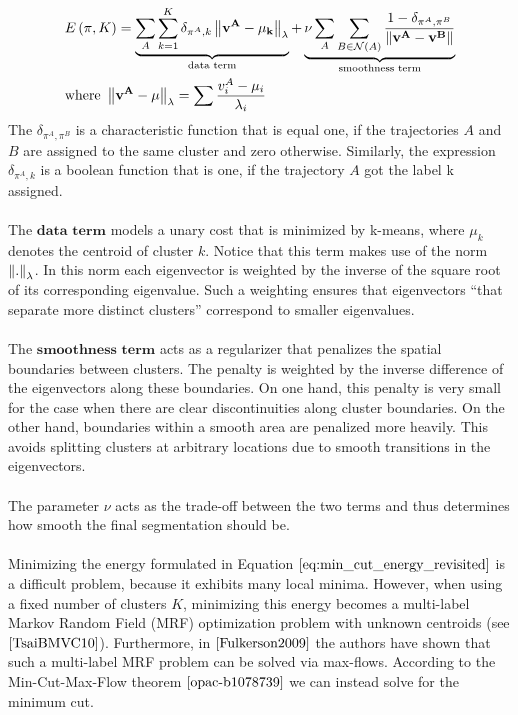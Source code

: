 \begin{equation}
\begin{aligned}
& E \left( \pi, K \right) = \underbrace{\sum_{A} \sum_{k=1}^K \delta_{\pi^A, k} \left\lVert\bf{v}^A - \mu_k\right\rVert_{\lambda}}_\text{data term} + \underbrace{\nu \sum_A \sum_{B \in \mathcal{N}(A)} \frac{1- \delta_{\pi^A, \pi^B}}{\left\lVert\bf{v}^A - \bf{v}^B\right\rVert}}_\text{smoothness term} \\
& \text{where } \left\lVert\bf{v}^A - \bf{\mu}\right\rVert_\lambda = \sum \frac{v_i^A -  \mu_i}{\lambda_i}
\end{aligned} 
\label{eq:min_cut_energy_revisited}
\end{equation}
The $\delta_{\pi^A, \pi^B}$ is a characteristic function that is equal one, if the trajectories $A$ and $B$ are assigned to the same cluster and zero otherwise. Similarly, the expression $\delta_{\pi^A, k}$ is a boolean function that is one, if the trajectory $A$ got the label k assigned. \\ \\
The $\textbf{data term}$ models a unary cost that is minimized by k-means, where $\mu_k$ denotes the centroid of cluster $k$. Notice that this term makes use of the norm $\left\lVert.\right\rVert_{\lambda}$. In this norm each eigenvector is weighted by the inverse of the square root of its corresponding eigenvalue. Such a weighting ensures that eigenvectors \enquote{that separate more distinct clusters} correspond to smaller eigenvalues. \\ \\
The $\textbf{smoothness term}$ acts as a regularizer that penalizes the spatial boundaries between clusters. The penalty is weighted by the inverse difference of the eigenvectors along these boundaries. On one hand, this penalty is very small for the case when there are clear discontinuities along cluster boundaries. On the other hand, boundaries within a smooth area are penalized more heavily. This avoids splitting clusters at arbitrary locations due to smooth transitions in the eigenvectors. \\ \\
The parameter $\nu$ acts as the trade-off between the two terms and thus determines how smooth the final segmentation should be. \\ \\
Minimizing the energy formulated in Equation $\ref{eq:min_cut_energy_revisited}$ is a difficult problem, because it exhibits many local minima. However, when using a fixed number of clusters $K$, minimizing this energy becomes a multi-label Markov Random Field (MRF) optimization problem with unknown centroids (see $\cite{TsaiBMVC10}$). Furthermore, in $\cite{Fulkerson2009}$ the authors have shown that such a multi-label MRF problem can be solved via max-flows. According to the Min-Cut-Max-Flow theorem $\cite{opac-b1078739}$ we can instead solve for the minimum cut. \\ \\
